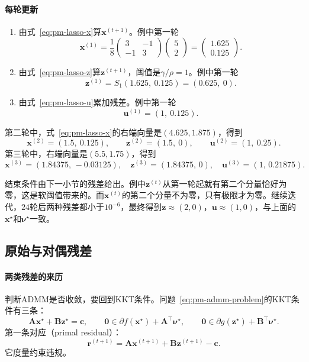 \paragraph{每轮更新}
\begin{enumerate}
 \item 由式~\eqref{eq:pm-lasso-x}算$\bm{x}^{(t+1)}$。例中第一轮
 \[
  \bm{x}^{(1)}=\frac18\begin{pmatrix}3&-1\\-1&3\end{pmatrix}\begin{pmatrix}5\\2\end{pmatrix}=\begin{pmatrix}1.625\\0.125\end{pmatrix}.
 \]
 \item 由式~\eqref{eq:pm-lasso-z}算$\bm{z}^{(t+1)}$，阈值是$\gamma/\rho=1$。例中第一轮
 \[
  \bm{z}^{(1)}=S_1(1.625,\ 0.125)=(0.625,\ 0).
 \]
 \item 由式~\eqref{eq:pm-lasso-u}累加残差。例中第一轮
 \[
  \bm{u}^{(1)}=(1,\ 0.125).
 \]
\end{enumerate}
第二轮中，式~\eqref{eq:pm-lasso-x}的右端向量是$(4.625,1.875)$，得到
\[
 \bm{x}^{(2)}=(1.5,\ 0.125),\qquad \bm{z}^{(2)}=(1.5,\ 0),\qquad \bm{u}^{(2)}=(1,\ 0.25).
\]
第三轮中，右端向量是$(5.5,1.75)$，得到
\[
 \bm{x}^{(3)}=(1.84375,\,-0.03125),\quad \bm{z}^{(3)}=(1.84375,\,0),\quad \bm{u}^{(3)}=(1,\,0.21875).
\]

结束条件由下一小节的残差给出。例中$\bm{z}^{(t)}$从第一轮起就有第二个分量恰好为零，这是软阈值带来的。而$\bm{x}^{(t)}$的第二个分量不为零，只有极限才为零。继续迭代，$24$轮后两种残差都小于$10^{-6}$，最终得到$\bm{z}\approx(2,0)$，$\bm{u}\approx(1,0)$，与上面的$\bm{x}^\star$和$\bm{\nu}^\star$一致。

\subsection{原始与对偶残差}
\label{sec:pm-admm-residuals}

\paragraph{两类残差的来历}
判断ADMM是否收敛，要回到KKT条件。问题~\eqref{eq:pm-admm-problem}的KKT条件有三条：
\begin{equation}
 \bm{A}\bm{x}^\star+\bm{B}\bm{z}^\star=\bm{c},\qquad
 \bm{0}\in\partial f(\bm{x}^\star)+\bm{A}^\top\bm{\nu}^\star,\qquad
 \bm{0}\in\partial g(\bm{z}^\star)+\bm{B}^\top\bm{\nu}^\star .
 \label{eq:pm-admm-kkt}
\end{equation}
第一条对应（primal residual）：
\begin{equation}
 \bm{r}^{(t+1)}=\bm{A}\bm{x}^{(t+1)}+\bm{B}\bm{z}^{(t+1)}-\bm{c}.
 \label{eq:pm-admm-primal-residual}
\end{equation}
它度量约束违规。

